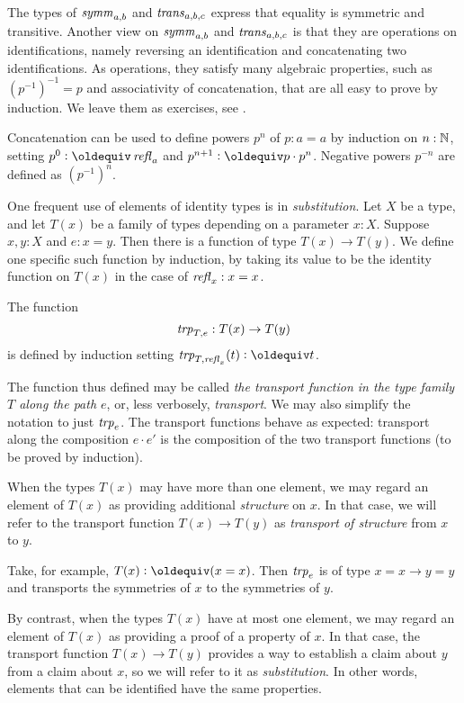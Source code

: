 The types of $\mathop{\mathit{symm}}_{a,b}$ and $\mathop{\mathit{trans}}_{a,b,c}$ express that
equality is symmetric and transitive. Another view on
$\mathop{\mathit{symm}}_{a,b}$ and $\mathop{\mathit{trans}}_{a,b,c}$ is that they are
operations on identifications, namely reversing an identification
and concatenating two identifications. As operations, they satisfy
many algebraic properties, such as $(p^{-1})^{-1} = p$ and
associativity of concatenation, that are all easy to prove by induction. 
We leave them as exercises, see \cite[Lemma 2.1.4]{hottbook}. 

Concatenation can be used to define powers $p^n$ of $p:a=a$
by induction on $n:\mathbb{N}$, setting $p^0\defeq\refl{a}$ and
$p^{n+1}\defeq p\cdot p^n$. Negative powers $p^{-n}$ are defined
as $(p^{-1})^n$.

One frequent use of elements of identity types is in \emph{substitution}.  
Let $X$ be a type, and let $T(x)$ be a family of types depending on a
parameter $x:X$.  Suppose $x,y:X$ and $e:x=y$.  
Then there is a function of type $T(x) \to T(y)$. 
We define one specific such function by induction, 
by taking its value to be the identity function on $T(x)$ 
in the case of $\mathop{{\it refl}_{x}}:x=x$.

\begin{definition}\label{def:transport} The function
  \[ 
  \mathop{\mathit{trp}_{T,e}} : T(x) \to T(y)
  \]
  is defined by induction setting $\trp{T,\refl{x}} (t) \defeq t$.
\end{definition} 
The function thus defined may be called 
\emph{the transport function in the type family $T$ along the path $e$}, 
 or, less verbosely, \emph{transport}.
 We may also simplify the notation to just $\mathop{\mathit{trp}_{e}}$.
The transport functions behave as expected: transport along the composition
$e\cdot e'$ is the composition of the two transport functions (to be
 proved by induction).

When the types $T(x)$ may have more than one element, 
we may regard an element of $T(x)$ as providing additional {\em structure} on $x$. 
In that case, we will refer to the transport function $T(x) \to T(y)$ as 
\emph{transport of structure} from $x$ to $y$. 

Take, for example, $T(x)\defeq (x=x)$. 
Then $\mathop{\mathit{trp}_{e}}$ is of type $x=x \to y=y$ and transports the
symmetries of $x$ to the symmetries of $y$.

By contrast, when the types
$T(x)$ have at most one element, we may regard an element of $T(x)$ 
as providing a proof of a property of $x$. In that case, the transport
function $T(x) \to T(y)$ provides a way to establish a claim about $y$ 
from a claim about $x$, so we will refer to it as \emph{substitution}.  In
other words, elements that can be identified have the same properties.



